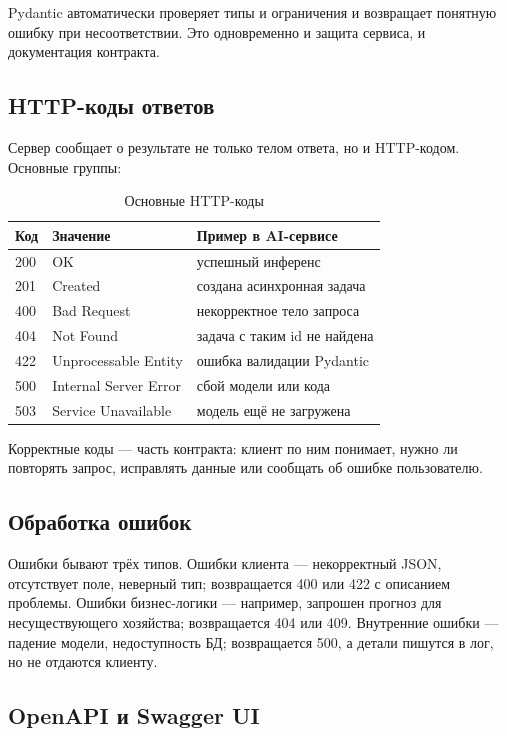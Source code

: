 \documentclass[12pt,a4paper]{article}
\begin{document}
Pydantic автоматически проверяет типы и ограничения и возвращает понятную ошибку при несоответствии. Это одновременно и защита сервиса, и документация контракта.

\subsection{HTTP-коды ответов}

Сервер сообщает о результате не только телом ответа, но и HTTP-кодом. Основные группы:

\begin{table}[H]
\centering
\caption{Основные HTTP-коды}
\label{tab:http_codes}
\begin{tabular}{|l|l|l|}
\hline
\textbf{Код} & \textbf{Значение} & \textbf{Пример в AI-сервисе} \\
\hline
200 & OK                    & успешный инференс \\
201 & Created               & создана асинхронная задача \\
400 & Bad Request           & некорректное тело запроса \\
404 & Not Found             & задача с таким id не найдена \\
422 & Unprocessable Entity  & ошибка валидации Pydantic \\
500 & Internal Server Error & сбой модели или кода \\
503 & Service Unavailable   & модель ещё не загружена \\
\hline
\end{tabular}
\end{table}

Корректные коды — часть контракта: клиент по ним понимает, нужно ли повторять запрос, исправлять данные или сообщать об ошибке пользователю.

\subsection{Обработка ошибок}

Ошибки бывают трёх типов. Ошибки клиента — некорректный JSON, отсутствует поле, неверный тип; возвращается 400 или 422 с описанием проблемы. Ошибки бизнес-логики — например, запрошен прогноз для несуществующего хозяйства; возвращается 404 или 409. Внутренние ошибки — падение модели, недоступность БД; возвращается 500, а детали пишутся в лог, но не отдаются клиенту.

\subsection{OpenAPI и Swagger UI}
\end{document}
